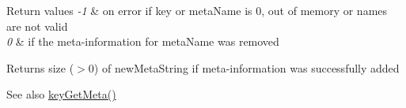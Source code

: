 \begin{DoxyRetVals}{Return values}
{\em -\/1} & on error if key or meta\+Name is 0, out of memory or names are not valid \\
\hline
{\em 0} & if the meta-\/information for meta\+Name was removed \\
\hline
\end{DoxyRetVals}
\begin{DoxyReturn}{Returns}
size ($>$0) of new\+Meta\+String if meta-\/information was successfully added 
\end{DoxyReturn}
\begin{DoxySeeAlso}{See also}
\mbox{\hyperlink{group__keymeta_ga9ed3875495ddb3d8a8d29158a60a147c}{key\+Get\+Meta()}} 
\end{DoxySeeAlso}
